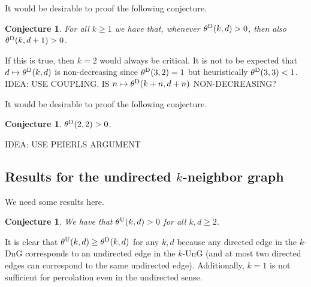 \documentclass{article}
\newtheorem{conj}[theorem]{Conjecture}
\theoremstyle{definition}
\newcommand{\1}{\mathbbm{1}}
\newcommand{\0}{\mathbf{o}}
\begin{document}
\bigskip
It would be desirable to proof the following conjecture.
\begin{conj}
For all $k\ge 1$ we have that, whenever $\theta^{\rm D}(k,d)>0$, then also $\theta^{\rm D}(k,d+1)>0$. 
\end{conj}
If this is true, then $k=2$ would always be critical. It is not to be expected that $d\mapsto\theta^{\rm D}(k,d)$ is non-decreasing since $\theta^{\rm D}(3,2)=1$ but heuristically $\theta^{\rm D}(3,3)<1$. IDEA: USE COUPLING. IS $n\mapsto \theta^{\rm D}(k+n,d+n)$ NON-DECREASING? 

It would be desirable to proof the following conjecture.
\begin{conj}
$\theta^{\rm D}(2,2)>0$. 
\end{conj}
IDEA: USE PEIERLS ARGUMENT

\subsection{Results for the undirected $k$-neighbor graph}
We need some results here.
\begin{conj}
We have that $\theta^{\rm U}(k,d)>0$ for all $k,d\ge 2$.  
\end{conj}

\medskip

It is clear that $\theta^{\rm U}(k,d) \geq \theta^{\rm D}(k,d)$ for any $k,d$ because any directed edge in the $k$-DnG corresponds to an undirected edge in the $k$-UnG (and at most two directed edges can correspond to the same undirected edge). Additionally, $k=1$ is not sufficient for percolation even in the undirected sense.
\end{document}
